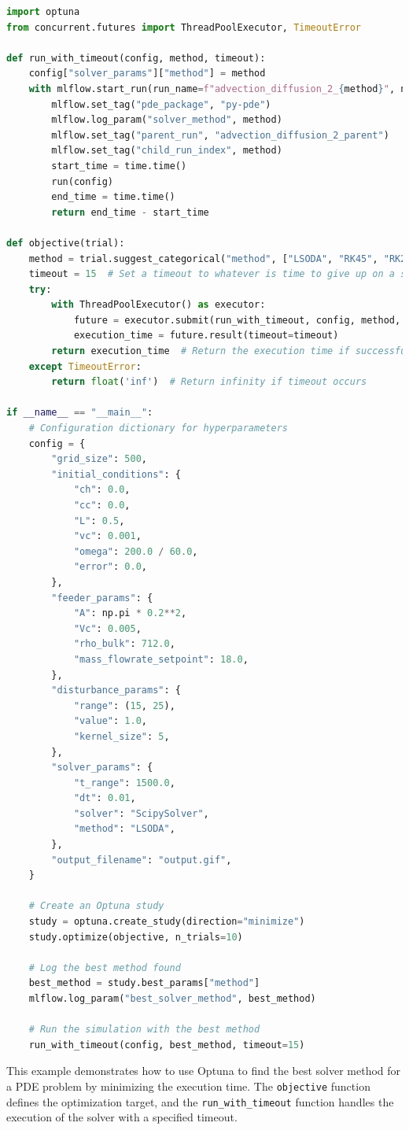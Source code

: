 \documentclass{article}
\begin{document}
\begin{lstlisting}[language=Python, caption=Optuna optimization for PDE solver selection, label=lst:optuna_pde]
import optuna
from concurrent.futures import ThreadPoolExecutor, TimeoutError

def run_with_timeout(config, method, timeout):
    config["solver_params"]["method"] = method
    with mlflow.start_run(run_name=f"advection_diffusion_2_{method}", nested=True):
        mlflow.set_tag("pde_package", "py-pde")
        mlflow.log_param("solver_method", method)
        mlflow.set_tag("parent_run", "advection_diffusion_2_parent")
        mlflow.set_tag("child_run_index", method)
        start_time = time.time()
        run(config)
        end_time = time.time()
        return end_time - start_time

def objective(trial):
    method = trial.suggest_categorical("method", ["LSODA", "RK45", "RK23", "Radau", "BDF"])
    timeout = 15  # Set a timeout to whatever is time to give up on a solver
    try:
        with ThreadPoolExecutor() as executor:
            future = executor.submit(run_with_timeout, config, method, timeout)
            execution_time = future.result(timeout=timeout)
        return execution_time  # Return the execution time if successful
    except TimeoutError:
        return float('inf')  # Return infinity if timeout occurs

if __name__ == "__main__":
    # Configuration dictionary for hyperparameters
    config = {
        "grid_size": 500,
        "initial_conditions": {
            "ch": 0.0,
            "cc": 0.0,
            "L": 0.5,
            "vc": 0.001,
            "omega": 200.0 / 60.0,
            "error": 0.0,
        },
        "feeder_params": {
            "A": np.pi * 0.2**2,
            "Vc": 0.005,
            "rho_bulk": 712.0,
            "mass_flowrate_setpoint": 18.0,
        },
        "disturbance_params": {
            "range": (15, 25),
            "value": 1.0,
            "kernel_size": 5,
        },
        "solver_params": {
            "t_range": 1500.0,
            "dt": 0.01,
            "solver": "ScipySolver",
            "method": "LSODA",
        },
        "output_filename": "output.gif",
    }

    # Create an Optuna study
    study = optuna.create_study(direction="minimize")
    study.optimize(objective, n_trials=10)

    # Log the best method found
    best_method = study.best_params["method"]
    mlflow.log_param("best_solver_method", best_method)

    # Run the simulation with the best method
    run_with_timeout(config, best_method, timeout=15)
\end{lstlisting}
This example demonstrates how to use Optuna to find the best solver method for a PDE problem by minimizing the execution time. The \texttt{objective} function defines the optimization target, and the \texttt{run\_with\_timeout} function handles the execution of the solver with a specified timeout.
\end{document}
